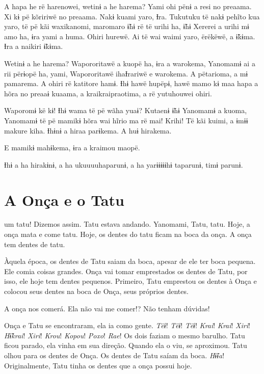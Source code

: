 A hapa he rë harenowei, wetinɨ a he harema? Yami ohi pënɨ a resi no
preaama. Xi kɨ pë kõririwë no preaama. Nakɨ kuami yaro, Ɨra. Tukutuku të
nakɨ pehĩto kua yaro, të pë kãi waxikanomi, maromaro ɨ̃hɨ rë të urihi ha,
ɨ̃hɨ Xererei a urihi mɨ amo ha, ɨra yami a huma. Ohiri hurewë. Ai të wai
waimi yaro, ërëkëwë, a ɨ̃kɨma. Ɨra a naikiri ɨ̃kɨma. 

Wetinɨ a he harema? Wapororitawë a kuopë ha, ɨra a warokema, Yanomamɨ ai
 a rii përɨopë ha, yami, Wapororitawë ihaƗrariwë e warokema. A pëtarioma,
 a mɨ pamarema. A ohiri rë katitore hamɨ. Ɨhɨ hawë hupëpɨ, hawë mamo kɨ
 maa hapa a hõra no preaaɨ kuaama, a kraikraipraotima, a rë yutuhouwei
 ohiri. 

Waporomɨ kë kɨ! Ɨhɨ wama të pë wãha yuaɨ? Kutaenɨ ɨ̃hɨ Yanomamɨ a kuoma,
Yanomamɨ të pë mamikɨ hõra wai hĩrio ma rë mai! Krihi! Të kãi kuimi, a
ɨmɨɨ makure kiha. Ɨhɨnɨ a hiraa parɨkema. A huɨ hirakema. 

E mamikɨ mahɨkema, ɨra a kraimou maopë. 

Ɨhɨ a ha hirakɨnɨ, a ha ukuuuuhaparunɨ, a ha yarɨɨɨɨɨhɨ taparunɨ, timɨ
parunɨ. 

\chapter{A Onça e o Tatu}
 
um tatu! Dizemos assim. Tatu estava andando. Yanomami, Tatu, tatu.
Hoje, a onça mata e come tatu. Hoje, os dentes do tatu ficam na boca da
onça. A onça tem dentes de tatu. 

Àquela época, os dentes de Tatu saiam da boca, apesar de ele ter boca
pequena. Ele comia coisas grandes. Onça vai tomar emprestados os dentes
de Tatu, por isso, ele hoje tem dentes pequenos. Primeiro, Tatu
emprestou os dentes à Onça e colocou seus dentes na boca de Onça, seus
próprios dentes. 

A onça nos comerá. Ela não vai me comer!? Não tenham dúvidas! 

Onça e Tatu se encontraram, ela ia como gente. \textit{Tëɨ}! \textit{Tëɨ}! \textit{Tëɨ}! \textit{Krai}!
\textit{Krai}! \textit{Xiri}! \textit{Hɨ̃krai}! \textit{Xiri}! \textit{Krou}! \textit{Kopou}! \textit{Poxo}! \textit{Rae}! Os dois faziam o mesmo
barulho. Tatu ficou parado, ela vinha em sua direção. Quando ela o viu, se
aproximou. Tatu olhou para os dentes de Onça. Os dentes de Tatu saíam da
boca. \textit{Hɨ̃ɨa}! Originalmente, Tatu tinha os dentes que a onça possui hoje. 


